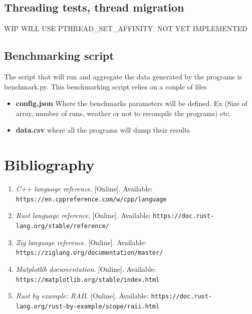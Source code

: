 \documentclass{article}
\begin{document}
\subsection{Threading tests, thread migration}
WIP
WILL USE PTHREAD\_SET\_AFFINITY. NOT YET IMPLEMENTED

\subsection{Benchmarking script}
The script that will run and aggregate the data generated by the programs is benchmark.py. This benchmarking script relies on a couple of files 
\begin{itemize}
    \item \textbf{config.json} Where the benchmarks parameters will be defined. Ex (Size of array, number of runs, weather or not to recompile the programs) etc.
    \item \textbf{data.csv} where all the programs will dump their results
\end{itemize}

\clearpage
\section{Bibliography}
\begin{enumerate}
    \item \textit{C++ language reference}. [Online]. Available: \texttt{https://en.cppreference.com/w/cpp/language}
    \item \textit{Rust language reference}. [Online]. Available: \texttt{https://doc.rust-lang.org/stable/reference/}
    \item \textit{Zig language reference}. [Online]. Available: \texttt{https://ziglang.org/documentation/master/}
    \item \textit{Matplotlib documentation}. [Online]. Available: \texttt{https://matplotlib.org/stable/index.html}
    \item \textit{Rust by example: RAII}. [Online]. Available: \texttt{https://doc.rust-lang.org/rust-by-example/scope/raii.html}
\end{enumerate}
\end{document}
